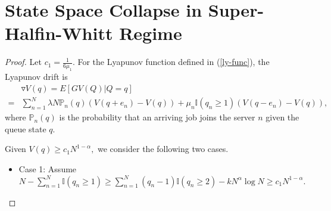 \documentclass[11pt,oneside,letter]{article}
\begin{document}
\section{State Space Collapse in Super-Halfin-Whitt Regime}
\sscsuper*
\begin{proof}
Let $c_1=\frac{1}{6\mu_{1}}.$
For the Lyapunov function defined in (\ref{ly-func}), the Lyapunov drift is
\begin{align*}
&\triangledown V(q)=E\left[GV(Q)|Q=q\right]\\
= &\sum_{n=1}^{N}\lambda N \mathbb P_n(q) (V(q + e_n) - V(q)) +  \mu_n \mathbb{I}(q_n\geq 1) (V(q - e_n)-V(q)), \nonumber
\end{align*}
{where $\mathbb P_n(q)$ is the probability that an arriving job joins the server $n$ given the queue state $q.$} 

Given $V(q)\geq c_1 {N^{1-\alpha}},$ we consider the following two cases.
\begin{itemize}
\item Case 1: Assume $N - \sum_{n=1}^{N} \mathbb{I}(q_n\geq 1) \geq \sum_{n=1}^{N} (q_n-1)\mathbb{I}(q_n\geq 2) - k N^{\alpha}\log N \geq c_1 {N^{1-\alpha}}.$


\end{itemize}
\end{proof}
\end{document}
